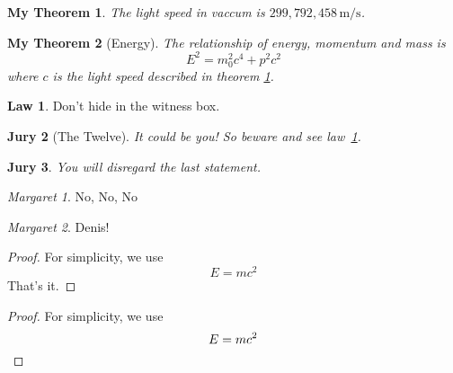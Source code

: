 \documentclass{article}
\begin{document}
	\newtheorem{mythm}{My Theorem}[section]
	\begin{mythm}\label{thm:light}
	The light speed in vaccum
	is $299,792,458\,\mathrm{m/s}$.
	\end{mythm}
	\begin{mythm}[Energy]
	The relationship of energy,
	momentum and mass is
	\[E^2 = m_0^2 c^4 + p^2 c^2\]
	where $c$ is the light speed
	described in theorem \ref{thm:light}.
	\end{mythm}
	
	\theoremstyle{definition} \newtheorem{law}{Law}
	\theoremstyle{plain} \newtheorem{jury}[law]{Jury}
	\theoremstyle{remark} \newtheorem*{mar}{Margaret}
	\begin{law}\label{law:box}
	Don’t hide in the witness box.
	\end{law}
	\begin{jury}[The Twelve]
	It could be you! So beware and
	see law~\ref{law:box}.\end{jury}
	\begin{jury}
	You will disregard the last
	statement.\end{jury}
	\begin{mar}No, No, No\end{mar}
	\begin{mar}Denis!\end{mar}
	\begin{proof}
	For simplicity, we use
	\[
	E=mc^2
	\]
	That’s it.
	\end{proof}
	\begin{proof}
	For simplicity, we use
	\[
	E=mc^2 \qedhere
	\]
	\end{proof}
	
\end{document}
